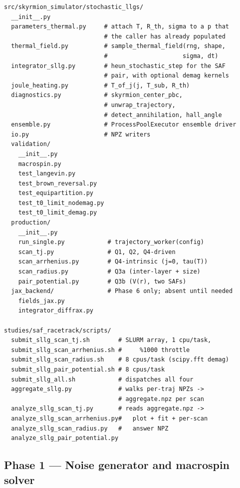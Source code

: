 \documentclass[11pt,a4paper]{article}
\begin{document}
\begin{lstlisting}
src/skyrmion_simulator/stochastic_llgs/
  __init__.py
  parameters_thermal.py     # attach T, R_th, sigma to a p that
                            # the caller has already populated
  thermal_field.py          # sample_thermal_field(rng, shape,
                            #                     sigma, dt)
  integrator_sllg.py        # heun_stochastic_step for the SAF
                            # pair, with optional demag kernels
  joule_heating.py          # T_of_j(j, T_sub, R_th)
  diagnostics.py            # skyrmion_center_pbc,
                            # unwrap_trajectory,
                            # detect_annihilation, hall_angle
  ensemble.py               # ProcessPoolExecutor ensemble driver
  io.py                     # NPZ writers
  validation/
    __init__.py
    macrospin.py
    test_langevin.py
    test_brown_reversal.py
    test_equipartition.py
    test_t0_limit_nodemag.py
    test_t0_limit_demag.py
  production/
    __init__.py
    run_single.py            # trajectory_worker(config)
    scan_tj.py               # Q1, Q2, Q4-driven
    scan_arrhenius.py        # Q4-intrinsic (j=0, tau(T))
    scan_radius.py           # Q3a (inter-layer + size)
    pair_potential.py        # Q3b (V(r), two SAFs)
  jax_backend/               # Phase 6 only; absent until needed
    fields_jax.py
    integrator_diffrax.py

studies/saf_racetrack/scripts/
  submit_sllg_scan_tj.sh        # SLURM array, 1 cpu/task,
  submit_sllg_scan_arrhenius.sh #     %1000 throttle
  submit_sllg_scan_radius.sh    # 8 cpus/task (scipy.fft demag)
  submit_sllg_pair_potential.sh # 8 cpus/task
  submit_sllg_all.sh            # dispatches all four
  aggregate_sllg.py             # walks per-traj NPZs ->
                                # aggregate.npz per scan
  analyze_sllg_scan_tj.py       # reads aggregate.npz ->
  analyze_sllg_scan_arrhenius.py#   plot + fit + per-scan
  analyze_sllg_scan_radius.py   #   answer NPZ
  analyze_sllg_pair_potential.py
\end{lstlisting}

\subsection{Phase 1 --- Noise generator and macrospin solver}
\end{document}
